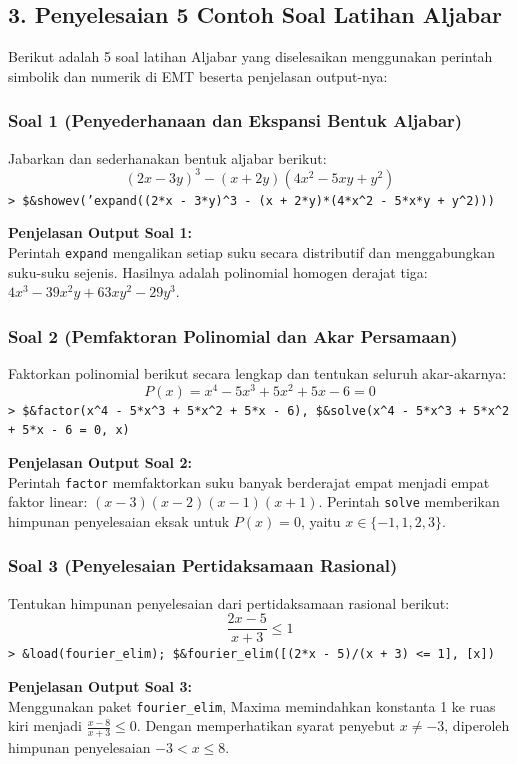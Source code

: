 \documentclass[11pt, a4paper]{article}
\newcommand{\emtcmd}[1]{\noindent\texttt{\textcolor{emtcommand}{>}\ #1}\par\smallskip}
\begin{document}
\subsection*{3. Penyelesaian 5 Contoh Soal Latihan Aljabar}

Berikut adalah 5 soal latihan Aljabar yang diselesaikan menggunakan perintah simbolik dan numerik di EMT beserta penjelasan output-nya:

\subsubsection*{Soal 1 (Penyederhanaan dan Ekspansi Bentuk Aljabar)}
Jabarkan dan sederhanakan bentuk aljabar berikut:
$$(2x - 3y)^3 - (x + 2y)(4x^2 - 5xy + y^2)$$
\emtcmd{\$\&showev('expand((2*x - 3*y)\^{}3 - (x + 2*y)*(4*x\^{}2 - 5*x*y + y\^{}2)))}

\textbf{Penjelasan Output Soal 1:} \\
Perintah \texttt{expand} mengalikan setiap suku secara distributif dan menggabungkan suku-suku sejenis. Hasilnya adalah polinomial homogen derajat tiga: $4x^3 - 39x^2y + 63xy^2 - 29y^3$.

\subsubsection*{Soal 2 (Pemfaktoran Polinomial dan Akar Persamaan)}
Faktorkan polinomial berikut secara lengkap dan tentukan seluruh akar-akarnya:
$$P(x) = x^4 - 5x^3 + 5x^2 + 5x - 6 = 0$$
\emtcmd{\$\&factor(x\^{}4 - 5*x\^{}3 + 5*x\^{}2 + 5*x - 6), \$\&solve(x\^{}4 - 5*x\^{}3 + 5*x\^{}2 + 5*x - 6 = 0, x)}

\textbf{Penjelasan Output Soal 2:} \\
Perintah \texttt{factor} memfaktorkan suku banyak berderajat empat menjadi empat faktor linear: $(x - 3)(x - 2)(x - 1)(x + 1)$. Perintah \texttt{solve} memberikan himpunan penyelesaian eksak untuk $P(x)=0$, yaitu $x \in \{-1, 1, 2, 3\}$.

\subsubsection*{Soal 3 (Penyelesaian Pertidaksamaan Rasional)}
Tentukan himpunan penyelesaian dari pertidaksamaan rasional berikut:
$$\frac{2x - 5}{x + 3} \le 1$$
\emtcmd{\&load(fourier\_elim); \$\&fourier\_elim([(2*x - 5)/(x + 3) <= 1], [x])}

\textbf{Penjelasan Output Soal 3:} \\
Menggunakan paket \texttt{fourier\_elim}, Maxima memindahkan konstanta 1 ke ruas kiri menjadi $\frac{x - 8}{x + 3} \le 0$. Dengan memperhatikan syarat penyebut $x \neq -3$, diperoleh himpunan penyelesaian $-3 < x \le 8$.
\end{document}
